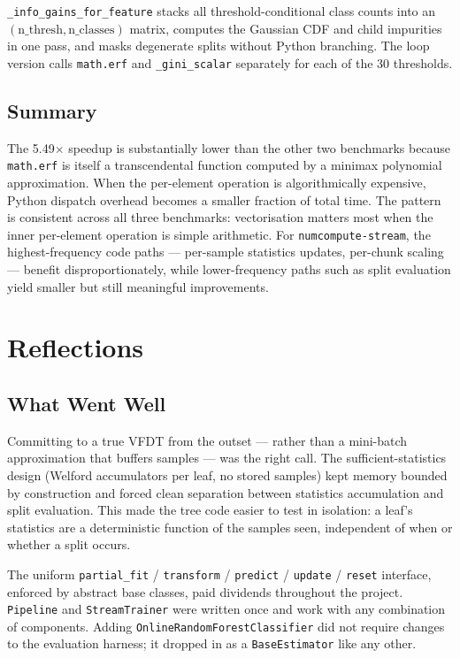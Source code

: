 \documentclass[10pt,a4paper]{article}
\begin{document}
\texttt{\_info\_gains\_for\_feature} stacks all threshold-conditional class counts into an $(\text{n\_thresh}, \text{n\_classes})$ matrix, computes the Gaussian CDF and child impurities in one pass, and masks degenerate splits without Python branching. The loop version calls \texttt{math.erf} and \texttt{\_gini\_scalar} separately for each of the 30 thresholds.

\subsection{Summary}

The 5.49$\times$ speedup is substantially lower than the other two benchmarks because \texttt{math.erf} is itself a transcendental function computed by a minimax polynomial approximation. When the per-element operation is algorithmically expensive, Python dispatch overhead becomes a smaller fraction of total time. The pattern is consistent across all three benchmarks: vectorisation matters most when the inner per-element operation is simple arithmetic. For \texttt{numcompute-stream}, the highest-frequency code paths --- per-sample statistics updates, per-chunk scaling --- benefit disproportionately, while lower-frequency paths such as split evaluation yield smaller but still meaningful improvements.

\section{Reflections}

\subsection{What Went Well}

Committing to a true VFDT from the outset --- rather than a mini-batch approximation that buffers samples --- was the right call. The sufficient-statistics design (Welford accumulators per leaf, no stored samples) kept memory bounded by construction and forced clean separation between statistics accumulation and split evaluation. This made the tree code easier to test in isolation: a leaf's statistics are a deterministic function of the samples seen, independent of when or whether a split occurs.

The uniform \texttt{partial\_fit} / \texttt{transform} / \texttt{predict} / \texttt{update} / \texttt{reset} interface, enforced by abstract base classes, paid dividends throughout the project. \texttt{Pipeline} and \texttt{StreamTrainer} were written once and work with any combination of components. Adding \texttt{OnlineRandomForestClassifier} did not require changes to the evaluation harness; it dropped in as a \texttt{BaseEstimator} like any other.
\end{document}
